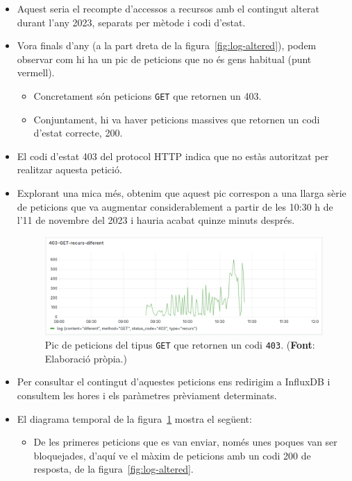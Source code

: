 \begin{itemize}
    \item Aquest seria el recompte d'accessos a recursos amb el contingut alterat durant l'any 2023, separats per mètode i codi d'estat.
    \item Vora finals d'any (a la part dreta de la figura~\ref{fig:log-altered}), podem observar com hi ha un pic de peticions que no és gens habitual (punt vermell).
    \begin{itemize}
        \item Concretament són peticions \texttt{GET} que retornen un 403.
        \item Conjuntament, hi va haver peticions massives que retornen un codi d'estat correcte, 200.
    \end{itemize}
    \item El codi d'estat 403 del protocol \gls{HTTP} indica que no estàs autoritzat per realitzar aquesta petició.
    \item Explorant una mica més, obtenim que aquest pic correspon a una llarga sèrie de peticions que va augmentar considerablement a partir de les 10:30 h de l'11 de novembre del 2023 i hauria acabat quinze minuts després.
    \clearpage
    \begin{figure}[htbp]
        \centerline{\includegraphics[width=\textwidth]{figures/possible-attacks-403}}
        \captionsetup{justification=centering}
        \caption[Pic de peticions del tipus \texttt{GET} que retornen un codi \texttt{403}.]{Pic de peticions del tipus \texttt{GET} que retornen un codi \texttt{403}. (\textbf{Font}: Elaboració pròpia.)}\label{fig:possible-attacks}
    \end{figure}
    \item Per consultar el contingut d'aquestes peticions ens redirigim a InfluxDB i consultem les hores i els paràmetres prèviament determinats.
    \item El diagrama temporal de la figura~\ref{fig:possible-attacks} mostra el següent:
    \begin{itemize}
        \item De les primeres peticions que es van enviar, només unes poques van ser bloquejades, d'aquí ve el màxim de peticions amb un codi 200 de resposta, de la figura~\ref{fig:log-altered}.

\end{itemize}
\end{itemize}

